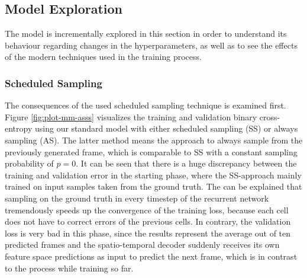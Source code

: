 \subsection{Model Exploration}

The model is incrementally explored in this section in order to understand its behaviour regarding changes in the hyperparameters, as well as to see the effects of the modern techniques used in the training process.

\subsubsection*{Scheduled Sampling}

The consequences of the used scheduled sampling technique is examined first. Figure \ref{fig:plot-mm-asss} visualizes the training and validation binary cross-entropy using our standard model with either scheduled sampling (SS) or always sampling (AS). The latter method means the approach to always sample from the previously generated frame, which is comparable to SS with a constant sampling probability of $p=0$. It can be seen that there is a huge discrepancy between the training and validation error in the starting phase, where the SS-approach mainly trained on input samples taken from the ground truth. The can be explained that sampling on the ground truth in every timestep of the recurrent network tremendously speeds up the convergence of the training loss, because each cell does not have to correct errors of the previous cells. In contrary, the validation loss is very bad in this phase, since the results represent the average out of ten predicted frames and the spatio-temporal decoder suddenly receives its own feature space predictions as input to predict the next frame, which is in contrast to the process while training so far.

